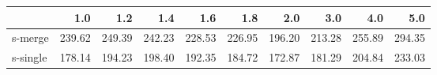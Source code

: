 \begin{tabular}{lrrrrrrrrr}
\toprule
{} &    1.0 &    1.2 &    1.4 &    1.6 &    1.8 &    2.0 &    3.0 &    4.0 &    5.0 \\
\midrule
s-merge  & 239.62 & 249.39 & 242.23 & 228.53 & 226.95 & 196.20 & 213.28 & 255.89 & 294.35 \\
s-single & 178.14 & 194.23 & 198.40 & 192.35 & 184.72 & 172.87 & 181.29 & 204.84 & 233.03 \\
\bottomrule
\end{tabular}
